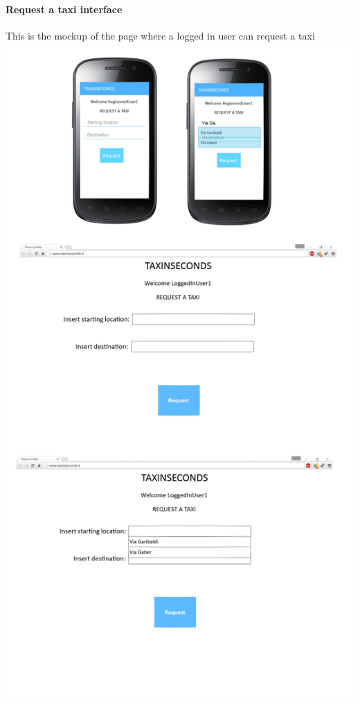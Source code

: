 \documentclass{article}
\begin{document}
\paragraph{Request a taxi interface}
This is the mockup of the page where a logged in user can request a taxi
\includegraphics{Request a taxi interface}
\clearpage
\end{document}
